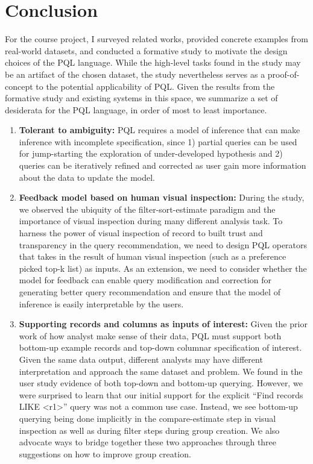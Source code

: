 \documentclass{sig-alternate-05-2015}
\begin{document}
\section{Conclusion}
For the course project, I surveyed related works, provided concrete examples from real-world datasets, and conducted a formative study to motivate the design choices of the PQL language. While the high-level tasks found in the study may be an artifact of the chosen dataset, the study nevertheless serves as a proof-of-concept to the potential applicability of PQL. Given the results from the formative study and existing systems in this space, we summarize a set of desiderata for the PQL language, in order of most to least importance.
\begin{enumerate}
  \item \textbf{Tolerant to ambiguity:} 
  PQL requires a model of inference that can make inference with incomplete specification, since 1) partial queries can be used for jump-starting the exploration of under-developed hypothesis and 2) queries can be iteratively refined and corrected as user gain more information about the data to update the model. 
  \item \textbf{Feedback model based on human visual inspection:} During the study, we observed the ubiquity of the filter-sort-estimate paradigm and the importance of visual inspection during many different analysis task. To harness the power of visual inspection of record to built trust and transparency in the query recommendation, we need to design PQL operators that takes in the result of human visual inspection (such as a preference picked top-k list) as inputs. As an extension, we need to consider whether the model for feedback can enable query modification and correction for generating better query recommendation and ensure that the model of inference is easily interpretable by the users.
  \item \textbf{Supporting records and columns as inputs of interest:} Given the prior work of how analyst make sense of their data\cite{Pirolli2005,Klein2006}, PQL must support both bottom-up example records and top-down columnar specification of interest. Given the same data output, different analysts may have different interpretation and approach the same dataset and problem. We found in the user study evidence of both top-down and bottom-up querying. However, we were surprised to learn that our initial support for the explicit ``Find records LIKE <r1>'' query was not a common use case. Instead, we see bottom-up querying being done implicitly in the compare-estimate step in visual inspection as well as during filter steps during group creation. We also advocate ways to bridge together these two approaches through three suggestions on how to improve group creation.

\end{enumerate}
\end{document}
